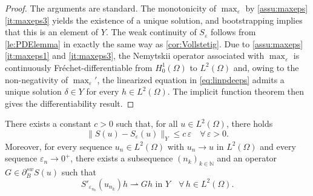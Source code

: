 \documentclass[reqno]{shinyart}
\begin{document}
\begin{proof}
    The arguments are standard. The monotonicity of ${\max\nolimits}_\varepsilon$ by 
    \cref{assu:maxeps}\ref{it:maxeps3} yields the existence of a unique solution, 
    and bootstrapping implies that this is an element of $Y$. 
    The weak continuity of $S_\varepsilon$ follows from \cref{le:PDElemma} 
    in exactly the same way as \cref{cor:Vollstetig}.
    Due to \cref{assu:maxeps}\ref{it:maxeps1} and \ref{it:maxeps3}, 
    the Nemytskii operator associated with ${\max\nolimits}_\varepsilon$ is continuously 
    Fr\'echet-differentiable from $H^1_0(\Omega)$ to $L^2(\Omega)$ and, 
    owing to the non-negativity of ${\max\nolimits}_\varepsilon'$, the linearized equation in 
    \eqref{eq:linpdeeps} admits a unique solution $\delta\in Y$ for every $h\in L^2(\Omega)$. 
    The implicit function theorem then gives the differentiability result.
\end{proof}

\begin{lemma}\label{lemma:regconv}
    There exists a constant $c > 0$ such that, for all $u\in L^2(\Omega)$, there holds 
    \begin{equation}\label{eq:Seps}
        \|S(u) - S_\varepsilon(u)\|_Y \leq c\, \varepsilon \quad \forall\, \varepsilon > 0.
    \end{equation}
    Moreover, for every sequence $u_n \in L^2(\Omega)$ with $u_n \to u$ in $L^2(\Omega)$ 
    and every sequence $\varepsilon_n \to 0^+$, there exists a subsequence 
    $(n_k)_{k\in{\mathbb{N}}}$ and an operator $G \in \partial_{B}^{sw} S(u)$ such that
    \begin{equation*}
        S'_{\varepsilon_{n_k}}(u_{n_k})h\rightharpoonup G h 
        \text{ in } Y\quad \forall \, h \in L^2(\Omega).
    \end{equation*}
\end{lemma}
\end{document}
